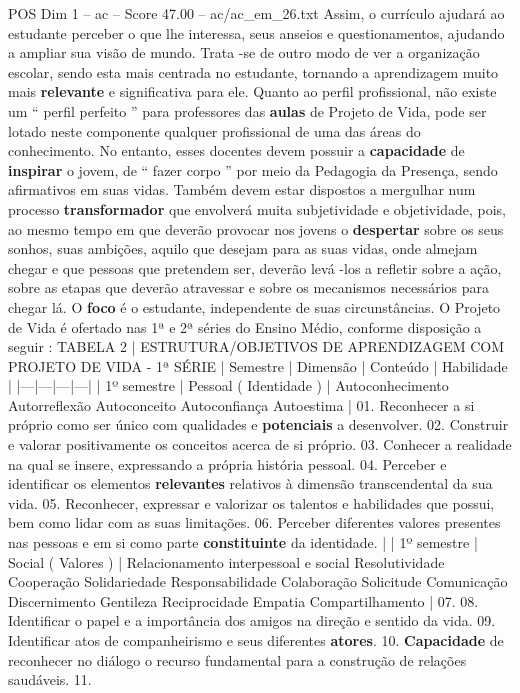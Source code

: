 \begin{textsample}{POS Dim 1 – ac – Score 47.00 – ac/ac\_em\_26.txt}
Assim, o currículo ajudará ao estudante perceber o que lhe interessa, seus anseios e questionamentos, ajudando a ampliar sua visão de mundo.
Trata -se de outro modo de ver a organização escolar, sendo esta mais centrada no estudante, tornando a aprendizagem muito mais \textbf{relevante} e significativa para ele.
Quanto ao perfil profissional, não existe um “ perfil perfeito ” para professores das \textbf{aulas} de Projeto de Vida, pode ser lotado neste componente qualquer profissional de uma das áreas do conhecimento.
No entanto, esses docentes devem possuir a \textbf{capacidade} de \textbf{inspirar} o jovem, de “ fazer corpo ” por meio da Pedagogia da Presença, sendo afirmativos em suas vidas.
Também devem estar dispostos a mergulhar num processo \textbf{transformador} que envolverá muita subjetividade e objetividade, pois, ao mesmo tempo em que deverão provocar nos jovens o \textbf{despertar} sobre os seus sonhos, suas ambições, aquilo que desejam para as suas vidas, onde almejam chegar e que pessoas que pretendem ser, deverão levá -los a refletir sobre a ação, sobre as etapas que deverão atravessar e sobre os mecanismos necessários para chegar lá.
O \textbf{foco} é o estudante, independente de suas circunstâncias.
O Projeto de Vida é ofertado nas 1ª e 2ª séries do Ensino Médio, conforme disposição a seguir : TABELA 2 | ESTRUTURA/OBJETIVOS DE APRENDIZAGEM COM PROJETO DE VIDA - 1ª SÉRIE | Semestre | Dimensão | Conteúdo | Habilidade | |---|---|---|---| | 1º semestre | Pessoal ( Identidade ) | Autoconhecimento Autorreflexão Autoconceito Autoconfiança Autoestima | 01.
Reconhecer a si próprio como ser único com qualidades e \textbf{potenciais} a desenvolver. 02.
Construir e valorar positivamente os conceitos acerca de si próprio. 03.
Conhecer a realidade na qual se insere, expressando a própria história pessoal. 04.
Perceber e identificar os elementos \textbf{relevantes} relativos à dimensão transcendental da sua vida. 05.
Reconhecer, expressar e valorizar os talentos e habilidades que possui, bem como lidar com as suas limitações. 06.
Perceber diferentes valores presentes nas pessoas e em si como parte \textbf{constituinte} da identidade. | | 1º semestre | Social ( Valores ) | Relacionamento interpessoal e social Resolutividade Cooperação Solidariedade Responsabilidade Colaboração Solicitude Comunicação Discernimento Gentileza Reciprocidade Empatia Compartilhamento | 07. 08.
Identificar o papel e a importância dos amigos na direção e sentido da vida. 09.
Identificar atos de companheirismo e seus diferentes \textbf{atores}. 10. \textbf{Capacidade} de reconhecer no diálogo o recurso fundamental para a construção de relações saudáveis. 11.

\end{textsample}

